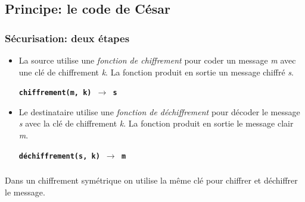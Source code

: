 \documentclass[svgnames,11pt]{beamer}
\begin{document}
\subsection{Principe: le code de César}
\begin{frame}
    \frametitle{Sécurisation: deux étapes}
\begin{itemize}
    \item<1-> La source utilise une \emph{fonction de chiffrement} pour coder un message \emph{m} avec une clé de chiffrement \emph{k}. La fonction produit en sortie un message chiffré \emph{s}.
    \begin{center}
        \textbf{\texttt{chiffrement(m, k) $\rightarrow$ s}}
    \end{center}
    \item<2-> Le destinataire utilise une \emph{fonction de déchiffrement} pour décoder le message \emph{s} avec la clé de chiffrement \emph{k}. La fonction produit en sortie le message clair \emph{m}.
    \begin{center}
        \textbf{\texttt{déchiffrement(s, k) $\rightarrow$ m}}
    \end{center}
\end{itemize}

\end{frame}

\begin{frame}
    \frametitle{}

    \begin{aretenir}[]
        Dans un chiffrement symétrique on utilise la même clé pour chiffrer et déchiffrer le message.
        \end{aretenir}

\end{frame}
\end{document}
